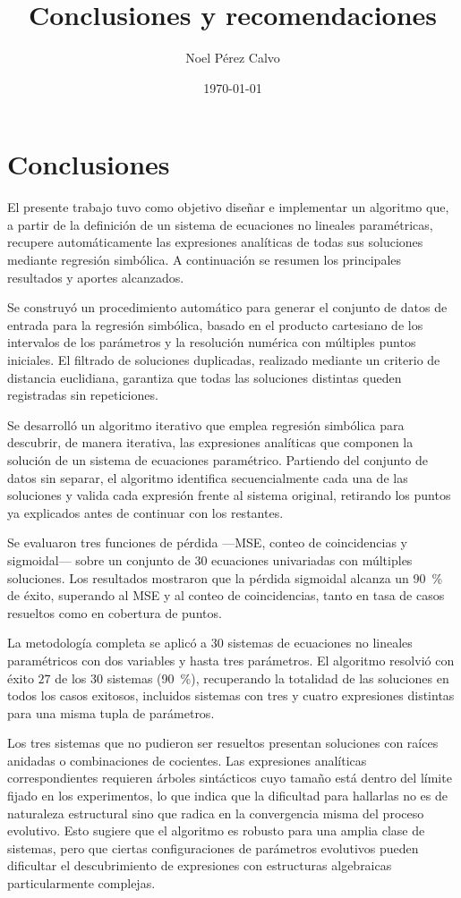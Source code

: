 \documentclass{article} \usepackage[utf8]{inputenc} \usepackage[spanish]{babel} \usepackage{amsmath, amssymb, amsthm} \usepackage{bm} \usepackage{float} \usepackage{longtable} \usepackage[hidelinks]{hyperref}
\title{Conclusiones y recomendaciones} \author{Noel Pérez Calvo} \date{\today}
\begin{document}
\maketitle

\section{Conclusiones} \label{sec:conclusiones}

El presente trabajo tuvo como objetivo diseñar e implementar un algoritmo que, a partir de la definición de un sistema de ecuaciones no lineales paramétricas, recupere automáticamente las expresiones analíticas de todas sus soluciones mediante regresión simbólica. A continuación se resumen los principales resultados y aportes alcanzados.

Se construyó un procedimiento automático para generar el conjunto de datos de entrada para la regresión simbólica, basado en el producto cartesiano de los intervalos de los parámetros y la resolución numérica con múltiples puntos iniciales. El filtrado de soluciones duplicadas, realizado mediante un criterio de distancia euclidiana, garantiza que todas las soluciones distintas queden registradas sin repeticiones.

Se desarrolló un algoritmo iterativo que emplea regresión simbólica para descubrir, de manera iterativa, las expresiones analíticas que componen la solución de un sistema de ecuaciones paramétrico. Partiendo del conjunto de datos sin separar, el algoritmo identifica secuencialmente cada una de las soluciones y valida cada expresión frente al sistema original, retirando los puntos ya explicados antes de continuar con los restantes.

Se evaluaron tres funciones de pérdida —MSE, conteo de coincidencias y sigmoidal— sobre un conjunto de $30$ ecuaciones univariadas con múltiples soluciones. Los resultados mostraron que la pérdida sigmoidal alcanza un 90~\% de éxito, superando al MSE y al conteo de coincidencias, tanto en tasa de casos resueltos como en cobertura de puntos.

La metodología completa se aplicó a $30$ sistemas de ecuaciones no lineales paramétricos con dos variables y hasta tres parámetros. El algoritmo resolvió con éxito $27$ de los $30$ sistemas (90~\%), recuperando la totalidad de las soluciones en todos los casos exitosos, incluidos sistemas con tres y cuatro expresiones distintas para una misma tupla de parámetros.

Los tres sistemas que no pudieron ser resueltos presentan soluciones con raíces anidadas o combinaciones de cocientes. Las expresiones analíticas correspondientes requieren árboles sintácticos cuyo tamaño está dentro del límite fijado en los experimentos, lo que indica que la dificultad para hallarlas no es de naturaleza estructural sino que radica en la convergencia misma del proceso evolutivo. Esto sugiere que el algoritmo es robusto para una amplia clase de sistemas, pero que ciertas configuraciones de parámetros evolutivos pueden dificultar el descubrimiento de expresiones con estructuras algebraicas particularmente complejas.
\end{document}
